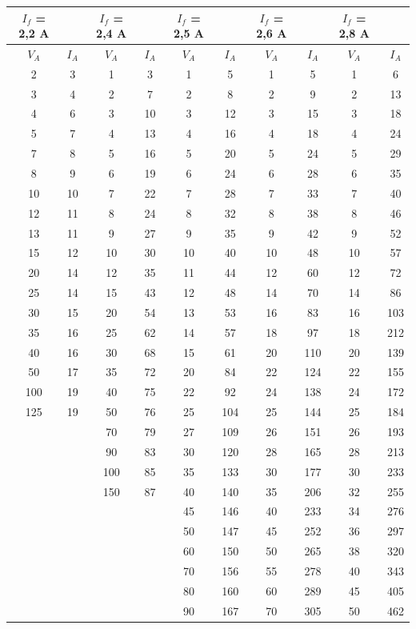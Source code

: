 \begin{table}[H]
\begin{tabular}{|c|c||c|c||c|c||c|c||c|c|}
$I_f$ = 2,2 A & & $I_f$ = 2,4 A & & $I_f$ = 2,5 A & & $I_f$ = 2,6 A & & $I_f$ = 2,8 A&\\
\hline
$V_A$ & $I_A$ & $V_A$ & $I_A$ & $V_A$ & $I_A$ & $V_A$ & $I_A$ & $V_A$ & $I_A$\\
\hline
2&	3&	1&	3&	1&	5&	1&	5&	1&	6\\
3&	4&	2&	7&	2&	8&	2&	9&	2&	13\\
4&	6&	3&	10&	3&	12&	3&	15&	3&	18\\
5&	7&	4&	13&	4&	16&	4&	18&	4&	24\\
7&	8&	5&	16&	5&	20&	5&	24&	5&	29\\
8&	9&	6&	19&	6&	24&	6&	28&	6&	35\\
10&	10&	7&	22&	7&	28&	7&	33&	7&	40\\
12&	11&	8&	24&	8&	32&	8&	38&	8&	46\\
13&	11&	9&	27&	9&	35&	9&	42&	9&	52\\
15&	12&	10&	30&	10&	40&	10&	48&	10&	57\\
20&	14&	12&	35&	11&	44&	12&	60&	12&	72\\
25&	14&	15&	43&	12&	48&	14&	70&	14&	86\\
30&	15&	20&	54&	13&	53&	16&	83&	16&	103\\
35&	16&	25&	62&	14&	57&	18&	97&	18&	212\\
40&	16&	30&	68&	15&	61&	20&	110&	20&	139\\
50&	17&	35&	72&	20&	84&	22&	124&	22&	155\\
100&	19&	40&	75&	22&	92&	24&	138&	24&	172\\
125&	19&	50&	76&	25&	104&	25&	144&	25&	184\\
	& &	70&	79&	27&	109&	26&	151&	26&	193\\
	& &	90&	83&	30&	120&	28&	165&	28&	213\\
	& &	100&	85&	35&	133&	30&	177&	30&	233\\
	& &	150&	87&	40&	140&	35&	206&	32&	255\\
	& &		&&	45&	146&	40&	233&	34&	276\\
	& &		&&	50&	147&	45&	252&	36&	297\\
	& &		&&	60&	150&	50&	265&	38&	320\\
	& &		&&	70&	156&	55&	278&	40&	343\\
	&&		&&	80&	160&	60&	289&	45&	405\\
	&&		&&	90&	167&	70&	305&	50&	462\\

\end{tabular}
\end{table}
